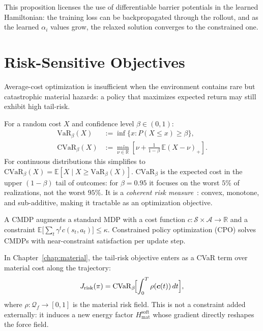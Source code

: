 This proposition licenses the use of differentiable barrier potentials in
the learned Hamiltonian: the training loss can be backpropagated through
the rollout, and as the learned $\alpha_i$ values grow, the relaxed solution
converges to the constrained one.

\section{Risk-Sensitive Objectives}
\label{sec:prelim:risk}

Average-cost optimization is insufficient when the environment contains
rare but catastrophic material hazards: a policy that maximizes expected
return may still exhibit high tail-risk.

\begin{definition}
\label{def:cvar}
For a random cost $X$ and confidence level $\beta \in (0,1)$:
\begin{align}
  \mathrm{VaR}_\beta(X) &:= \inf\{x : P(X \leq x) \geq \beta\},
  \label{eq:var} \\
  \mathrm{CVaR}_\beta(X) &:= \min_{\nu \in \mathbb{R}}
    \left[\nu + \frac{1}{1-\beta}\,\mathbb{E}(X - \nu)_+\right].
  \label{eq:cvar}
\end{align}
For continuous distributions this simplifies to
$\mathrm{CVaR}_\beta(X) = \mathbb{E}[X \mid X \geq \mathrm{VaR}_\beta(X)]$.
$\mathrm{CVaR}_\beta$ is the expected cost in the upper $(1-\beta)$ tail of
outcomes: for $\beta = 0.95$ it focuses on the worst $5\%$ of realizations,
not the worst $95\%$.
It is a \emph{coherent risk measure}~\citep{rockafellar2002cvar}:
convex, monotone, and sub-additive, making it tractable as an optimization
objective.
\end{definition}

\begin{definition}
\label{def:cmdp}
A CMDP augments a standard MDP with a cost function $c : \mathcal{S}\times\mathcal{A}\to\mathbb{R}$
and a constraint $\mathbb{E}\bigl[\sum_t \gamma^t c(s_t,a_t)\bigr] \leq \kappa$.
Constrained policy optimization (CPO) solves CMDPs with near-constraint
satisfaction per update step.
\end{definition}

In Chapter~\ref{chap:material}, the tail-risk objective enters as a
CVaR term over material cost along the trajectory:
\begin{equation}
  J_{\mathrm{risk}}(\pi)
  = \mathrm{CVaR}_\beta\!\Bigl[\int_0^T \rho(\vec{c}(t))\,dt\Bigr],
  \label{eq:cvar_objective}
\end{equation}
where $\rho : \mathcal{Q}_f \to [0,1]$ is the material risk field.
This is not a constraint added externally: it induces a new energy factor
$H_{\mathrm{mat}}^{\mathrm{soft}}$ whose gradient directly reshapes the
force field.


